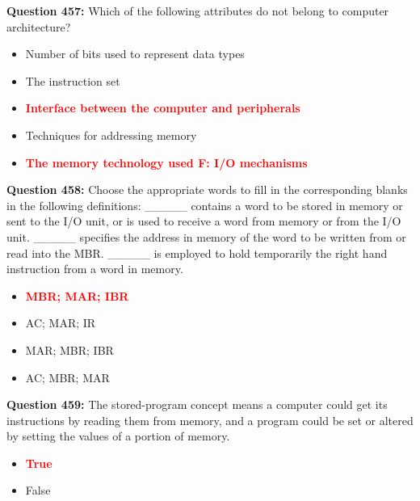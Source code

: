 \documentclass[12pt,a4paper]{article}
\begin{document}
\textbf{Question 457:} Which of the following attributes do not belong to computer architecture?

\begin{itemize}
    \item[\textbf{A.}] Number of bits used to represent data types
    \item[\textbf{B.}] The instruction set
    \item[\textbf{C.}] \textcolor{red}{\textbf{Interface between the computer and peripherals}}
    \item[\textbf{D.}] Techniques for addressing memory
    \item[\textbf{E.}] \textcolor{red}{\textbf{The memory technology used
F: I/O mechanisms}}
\end{itemize}

\vspace{0.5cm}

\textbf{Question 458:} Choose the appropriate words to fill in the corresponding blanks in the following definitions:
_____ contains a word to be stored in memory or sent to the I/O unit, or is used to receive a word from memory or from the I/O unit. _____ specifies the address in memory of the word to be written from or read into the MBR. _____ is employed to hold temporarily the right hand instruction from a word in memory.

\begin{itemize}
    \item[\textbf{A.}] \textcolor{red}{\textbf{MBR; MAR; IBR}}
    \item[\textbf{B.}] AC; MAR; IR
    \item[\textbf{C.}] MAR; MBR; IBR
    \item[\textbf{D.}] AC; MBR; MAR
\end{itemize}

\vspace{0.5cm}

\textbf{Question 459:} The stored-program concept means a computer could get its instructions by reading them from memory, and a program could be set or altered by setting the values of a portion of memory.

\begin{itemize}
    \item[\textbf{A.}] \textcolor{red}{\textbf{True}}
    \item[\textbf{B.}] False
\end{itemize}

\vspace{0.5cm}
\end{document}
